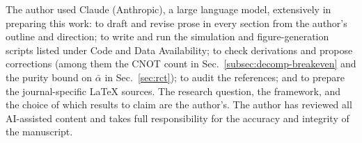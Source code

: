 
The author used Claude (Anthropic), a large language model, extensively in
preparing this work: to draft and revise prose in every section from the
author's outline and direction; to write and run the simulation and
figure-generation scripts listed under Code and Data Availability; to
check derivations and propose corrections (among them the CNOT count in
Sec.~\ref{subsec:decomp-breakeven} and the purity bound on $\bar\alpha$ in
Sec.~\ref{sec:rct}); to audit the references; and to prepare the
journal-specific LaTeX sources. The research question, the framework, and
the choice of which results to claim are the author's. The author has
reviewed all AI-assisted content and takes full responsibility for the
accuracy and integrity of the manuscript.
